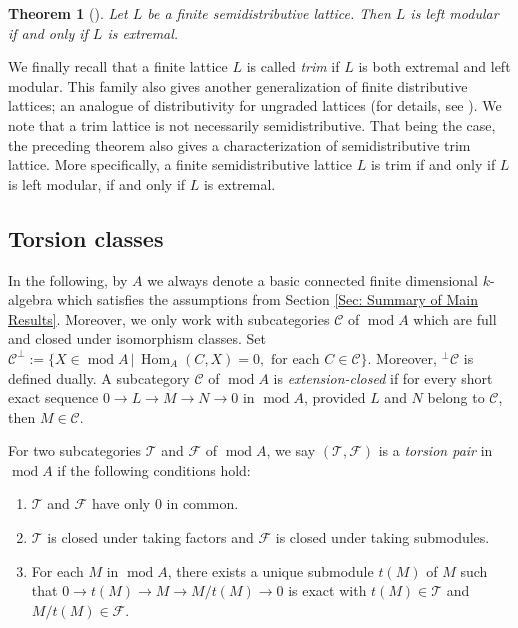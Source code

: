 \documentclass{amsart}
\theoremstyle{thmstyle}
\newtheorem{theorem}[thm]{Theorem}
\theoremstyle{exstyle}
\theoremstyle{defstyle}
\theoremstyle{remstyle}
\theoremstyle{remstyle}
\newcommand{\Hom}{\operatorname{Hom}}
\DeclareMathOperator*{\modu}{mod}
\begin{document}
\begin{theorem}[\cite{Mu,TW}]\label{Thm: trim=extremal=left modular}
Let $L$ be a finite semidistributive lattice. Then $L$ is left modular if and only if $L$ is extremal.
\end{theorem}

We finally recall that a finite lattice $L$ is called \emph{trim} if $L$ is both extremal and left modular. This family also gives another generalization of finite distributive lattices; an analogue of distributivity for ungraded lattices (for details, see \cite{Th}). 
We note that a trim lattice is not necessarily semidistributive. 
That being the case, the preceding theorem also gives a characterization of semidistributive trim lattice. More specifically, a finite semidistributive lattice $L$ is trim if and only if $L$ is left modular, if and only if $L$ is extremal.

\subsection{Torsion classes}\label{Subsec: Torsion Classes}
In the following, by $A$ we always denote a basic connected finite dimensional $k$-algebra which satisfies the assumptions from Section \ref{Sec: Summary of Main Results}. Moreover, we only work with subcategories $\mathcal{C}$ of $\modu A$ which are full and closed under isomorphism classes. Set $\mathcal{C}^\perp:=\{X \in \modu A\,|\, \Hom_A(C,X)=0, \text{ for each } C \in \mathcal{C}\}$. Moreover, ${}^\perp \mathcal{C}$ is defined dually. 
A subcategory $\mathcal{C}$ of $\modu A$ is \emph{extension-closed} if for every short exact sequence $0\rightarrow L \rightarrow M \rightarrow N \rightarrow 0$ in $\modu A$, provided $L$ and $N$ belong to $\mathcal{C}$, then $M \in \mathcal{C}$. 

For two subcategories $\mathcal{T}$ and $\mathcal{F}$ of $\modu A$, we say $(\mathcal{T},\mathcal{F})$ is a \emph{torsion pair} in $\modu A$ if the following conditions hold:
\begin{enumerate}
    \item $\mathcal{T}$ and $\mathcal{F}$ have only $0$ in common.
    \item $\mathcal{T}$ is closed under taking factors and $\mathcal{F}$ is closed under taking submodules.
    \item For each $M$ in $\modu A$, there exists a unique submodule $t(M)$ of $M$ such that $0 \rightarrow t(M) \rightarrow M \rightarrow M/t(M)\rightarrow 0$ is exact with $t(M) \in \mathcal{T}$ and $M/t(M) \in \mathcal{F}$.
\end{enumerate}
\end{document}
